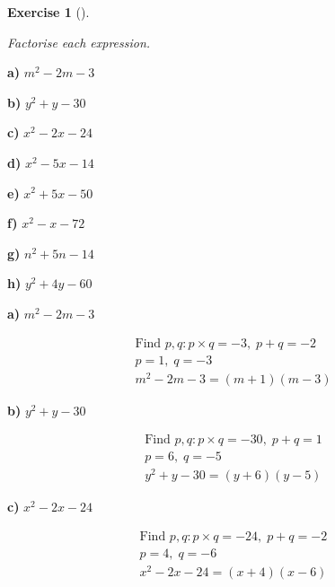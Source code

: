 \documentclass[
  letterpaper,
  DIV=11,
  numbers=noendperiod]{scrreprt}
\theoremstyle{definition}
\newtheorem{exercise}{Exercise}[chapter]
\theoremstyle{remark}
\begin{document}
\begin{exercise}[]\protect\hypertarget{exr-u6-2}{}\label{exr-u6-2}

\emph{Factorise each expression.}

\textbf{a)} \(\displaystyle m^2 - 2m - 3\)

\textbf{b)} \(\displaystyle y^2 + y - 30\)

\textbf{c)} \(\displaystyle x^2 - 2x - 24\)

\textbf{d)} \(\displaystyle x^2 - 5x - 14\)

\textbf{e)} \(\displaystyle x^2 + 5x - 50\)

\textbf{f)} \(\displaystyle x^2 - x - 72\)

\textbf{g)} \(\displaystyle n^2 + 5n - 14\)

\textbf{h)} \(\displaystyle y^2 + 4y - 60\)

\begin{tcolorbox}[enhanced jigsaw, opacitybacktitle=0.6, coltitle=black, arc=.35mm, colframe=quarto-callout-tip-color-frame, colback=white, bottomrule=.15mm, left=2mm, colbacktitle=quarto-callout-tip-color!10!white, titlerule=0mm, opacityback=0, title=\textcolor{quarto-callout-tip-color}{\faLightbulb}\hspace{0.5em}{🔍 View Solutions}, leftrule=.75mm, breakable, rightrule=.15mm, bottomtitle=1mm, toptitle=1mm, toprule=.15mm]

\textbf{a)} \(\displaystyle m^2 - 2m - 3\)

\begin{align*}
\text{Find } p, q: p \times q = -3,\; p + q = -2 \\ p = 1,\; q = -3 \\ m^2 - 2m - 3 = (m + 1)(m - 3)
\end{align*}

\textbf{b)} \(\displaystyle y^2 + y - 30\)

\begin{align*}
\text{Find } p, q: p \times q = -30,\; p + q = 1 \\ p = 6,\; q = -5 \\ y^2 + y - 30 = (y + 6)(y - 5)
\end{align*}

\textbf{c)} \(\displaystyle x^2 - 2x - 24\)

\begin{align*}
\text{Find } p, q: p \times q = -24,\; p + q = -2 \\ p = 4,\; q = -6 \\ x^2 - 2x - 24 = (x + 4)(x - 6)
\end{align*}


\end{tcolorbox}
\end{exercise}
\end{document}
